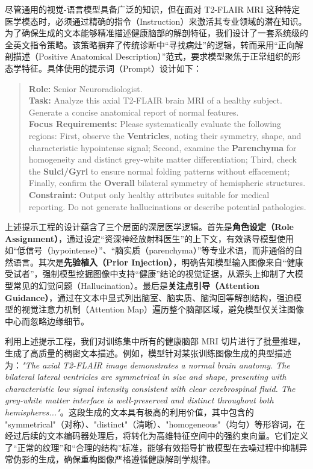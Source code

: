 \documentclass[Win]{xjtuBSThesis}  %
\begin{document}
尽管通用的视觉-语言模型具备广泛的知识，但在面对 T2-FLAIR MRI 这种特定医学模态时，必须通过精确的指令（Instruction）来激活其专业领域的潜在知识。为了确保生成的文本能够精准描述健康脑部的解剖特征，我们设计了一套系统级的全英文指令策略。该策略摒弃了传统诊断中“寻找病灶”的逻辑，转而采用“正向解剖描述（Positive Anatomical Description）”范式，要求模型聚焦于正常组织的形态学特征。具体使用的提示词（Prompt）设计如下：

\begin{quote}
\textbf{Role:} Senior Neuroradiologist. \\
\textbf{Task:} Analyze this axial T2-FLAIR brain MRI of a healthy subject. Generate a concise anatomical report of normal features. \\
\textbf{Focus Requirements:} Please systematically evaluate the following regions: First, observe the \textbf{Ventricles}, noting their symmetry, shape, and characteristic hypointense signal; Second, examine the \textbf{Parenchyma} for homogeneity and distinct grey-white matter differentiation; Third, check the \textbf{Sulci/Gyri} to ensure normal folding patterns without effacement; Finally, confirm the \textbf{Overall} bilateral symmetry of hemispheric structures. \\
\textbf{Constraint:} Output only healthy attributes suitable for medical reporting. Do not generate hallucinations or describe potential pathologies.
\end{quote}

上述提示工程的设计蕴含了三个层面的深层医学逻辑。首先是\textbf{角色设定（Role Assignment）}，通过设定“资深神经放射科医生”的上下文，有效诱导模型使用如“低信号（hypointense）”、“脑实质（parenchyma）”等专业术语，而非通俗的自然语言。其次是\textbf{先验植入（Prior Injection）}，明确告知模型输入图像来自“健康受试者”，强制模型挖掘图像中支持“健康”结论的视觉证据，从源头上抑制了大模型常见的幻觉问题（Hallucination）。最后是\textbf{关注点引导（Attention Guidance）}，通过在文本中显式列出脑室、脑实质、脑沟回等解剖结构，强迫模型的视觉注意力机制（Attention Map）遍历整个脑部区域，避免模型仅关注图像中心而忽略边缘细节。

利用上述提示工程，我们对训练集中所有的健康脑部 MRI 切片进行了批量推理，生成了高质量的稠密文本描述。例如，模型针对某张训练图像生成的典型描述为：\textit{"The axial T2-FLAIR image demonstrates a normal brain anatomy. The bilateral lateral ventricles are symmetrical in size and shape, presenting with characteristic low signal intensity consistent with clear cerebrospinal fluid. The grey-white matter interface is well-preserved and distinct throughout both hemispheres..."}。这段生成的文本具有极高的利用价值，其中包含的 "symmetrical"（对称）、"distinct"（清晰）、"homogeneous"（均匀）等形容词，在经过后续的文本编码器处理后，将转化为高维特征空间中的强约束向量。它们定义了“正常的纹理”和“合理的结构”标准，能够有效指导扩散模型在去噪过程中抑制异常伪影的生成，确保重构图像严格遵循健康解剖学规律。
\end{document}
